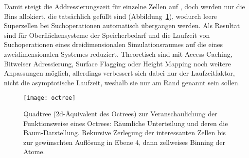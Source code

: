 Damit steigt die Addressierungszeit für einzelne Zellen auf , doch werden nur die Bins allokiert, die tatsächlich gefüllt sind (Abbildung~\ref{fig:octree}), wodurch leere Superzellen bei Suchoperationen automatisch übergangen werden.
Als Resultat sind für Oberflächensysteme der Speicherbedarf und die Laufzeit von Suchoperationen eines dreidimensionalen Simulationsraumes auf die eines zweidimensionalen Systemes reduziert.
Theoretisch sind mit Access Caching, Bitweiser Adressierung, Surface Flagging oder Height Mapping noch weitere Anpassungen möglich, allerdings verbessert sich dabei nur der Laufzeitfaktor, nicht die asymptotische Laufzeit, weshalb sie nur am Rand genannt sein sollen.


\begin{figure}
  \centering
  \texttt{[image: octree]}
  \caption[Funktionsweise eines Octrees]{Quadtree (2d-Äquivalent des Octrees) zur Veranschaulichung der Funktionsweise eines Octrees:
    Räumliche Unterteilung und deren die Baum-Darstellung.
    Rekursive Zerlegung der interessanten Zellen bis zur gewünschten Auflösung in Ebene 4, dann zellweises Binning der Atome.
  }
  \label{fig:octree}
\end{figure}

